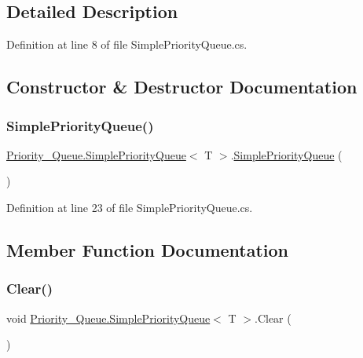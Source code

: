 \subsection{Detailed Description}


Definition at line 8 of file Simple\+Priority\+Queue.\+cs.



\subsection{Constructor \& Destructor Documentation}
\mbox{\label{class_priority___queue_1_1_simple_priority_queue_a4f0f5f2a811fdda31dedffffbaf6407f}} 
\subsubsection{\texorpdfstring{Simple\+Priority\+Queue()}{SimplePriorityQueue()}}
{\footnotesize\ttfamily \hyperlink{class_priority___queue_1_1_simple_priority_queue}{Priority\+\_\+\+Queue.\+Simple\+Priority\+Queue}$<$ T $>$.\hyperlink{class_priority___queue_1_1_simple_priority_queue}{Simple\+Priority\+Queue} (\begin{DoxyParamCaption}{ }\end{DoxyParamCaption})}



Definition at line 23 of file Simple\+Priority\+Queue.\+cs.



\subsection{Member Function Documentation}
\mbox{\label{class_priority___queue_1_1_simple_priority_queue_a23b62d7c0a813de7136c48396f2e936c}} 
\subsubsection{\texorpdfstring{Clear()}{Clear()}}
{\footnotesize\ttfamily void \hyperlink{class_priority___queue_1_1_simple_priority_queue}{Priority\+\_\+\+Queue.\+Simple\+Priority\+Queue}$<$ T $>$.Clear (\begin{DoxyParamCaption}{ }\end{DoxyParamCaption})}



